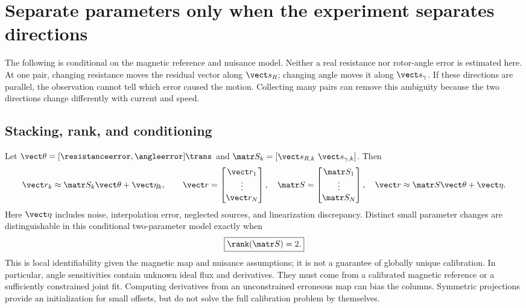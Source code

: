 \section{Separate parameters only when the experiment separates directions}
\label{sec:identification}
The following is conditional on the magnetic reference and nuisance
model. Neither a real resistance nor rotor-angle error is estimated here.
At one pair, changing resistance moves the residual vector along
$\vect s_R$; changing angle moves it along $\vect s_\gamma$. If these
directions are parallel, the observation cannot tell which error caused the
motion. Collecting many pairs can remove this ambiguity because the two
directions change differently with current and speed.

\subsection{Stacking, rank, and conditioning}
Let $\vect\theta=[\resistanceerror,\angleerror]\trans$ and
$\matr S_k=[\vect s_{R,k}\ \vect s_{\gamma,k}]$. Then
\begin{equation}
 \vect r_k\approx\matr S_k\vect\theta+\vect\eta_k,\qquad
 \vect r=\begin{bmatrix}\vect r_1\\\vdots\\\vect r_N\end{bmatrix},\quad
 \matr S=\begin{bmatrix}\matr S_1\\\vdots\\\matr S_N\end{bmatrix},
 \quad\vect r\approx\matr S\vect\theta+\vect\eta.
 \label{eq:stacked}
\end{equation}
Here $\vect\eta$ includes noise, interpolation error, neglected sources, and
linearization discrepancy. Distinct small parameter changes are distinguishable
in this conditional two-parameter model exactly when
\begin{equation}
 \boxed{\rank(\matr S)=2.}\label{eq:rank-condition}
\end{equation}
This is local identifiability given the magnetic map and nuisance assumptions;
it is not a guarantee of globally unique calibration. In particular, angle
sensitivities contain unknown ideal flux and derivatives. They must come from
a calibrated magnetic reference or a sufficiently constrained joint fit.
Computing derivatives from an unconstrained erroneous map can bias the columns.
Symmetric projections provide an initialization for small offsets, but do not
solve the full calibration problem by themselves.

